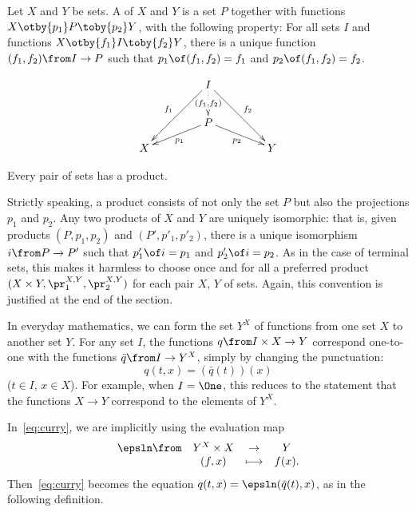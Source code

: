 \documentclass[12pt]{article}
\begin{document}
\begin{dfn}
Let $X$ and $Y$ be sets.  A  of $X$ and $Y$ is a set $P$
together with functions $X \otby{p_1} P \toby{p_2} Y$, with the following
property:
\medskip\noindent
For all sets $I$
and functions $X \otby{f_1} I \toby{f_2} Y$,
there is a unique function $(f_1, f_2)\from I \to P$
such that
$p_1 \of (f_1, f_2) = f_1$ and $p_2 \of (f_1, f_2) = f_2$.
\end{dfn}
\[
\begin{xy}
(0,20)*+{I}="test";
(0,8)*+{P}="prod";
(-20,0)*+{X}="first";
(20,0)*+{Y}="second";
{\ar_{f_1} "test"; "first"};
{\ar^{f_2} "test"; "second"};
{\ar@{.>}|{(f_1, f_2)} "test"; "prod"};
{\ar^{p_1} "prod"; "first"};
{\ar_{p_2} "prod"; "second"};
\end{xy}
\]
% 
\begin{axiom}
Every pair of sets has a product.
\end{axiom}
Strictly speaking, a product consists of not only the set $P$ but also the
projections $p_1$ and $p_2$.  Any two products of $X$ and $Y$ are uniquely
isomorphic: that is, given products $(P, p_1, p_2)$ and $(P', p'_1, p'_2)$,
there is a unique isomorphism $i\from P \to P'$ such that $p'_1 \of i =
p_1$ and $p'_2 \of i = p_2$.  As in the case of terminal sets, this makes
it harmless to choose once and for all a preferred product $(X \times Y,
\pr^{X, Y}_1, \pr^{X, Y}_2)$ for each pair $X$, $Y$ of sets.  Again, this
convention is justified at the end of the section.


% 
In everyday mathematics, we can form the set $Y^X$ of functions from one
set $X$ to another set $Y$.  For any set $I$, the functions $q \from I
\times X \to Y$ correspond one-to-one with the functions $\bar{q}\from I
\to Y^X$, simply by changing the punctuation:
% 
\begin{equation}        \label{eq:curry}
q(t, x)
=
(\bar{q}(t))(x)
\end{equation}
% 
($t \in I$, $x \in X$).  For example, when $I = \One$, this reduces to the
statement that the functions $X \to Y$ correspond to the elements of $Y^X$.

In~\eqref{eq:curry}, we are implicitly using the evaluation map
\[
\begin{array}{cccc}
\epsln\from     &Y^X \times X   &\to            &Y      \\
                &(f, x)         &\longmapsto    &f(x).
\end{array}
\]
Then~\eqref{eq:curry} becomes the equation $q(t, x) = \epsln (\bar{q}(t),
x)$, as in the following definition.
\end{document}
